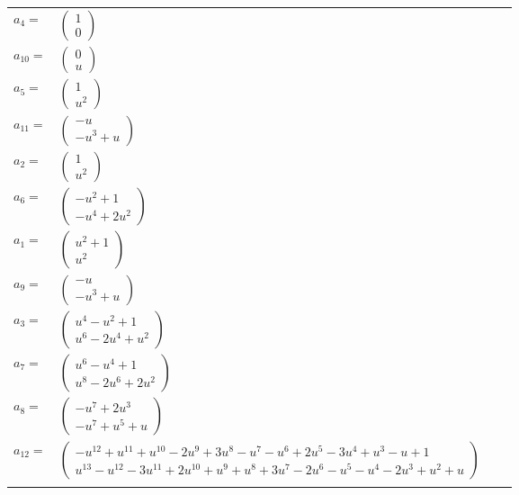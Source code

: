 \documentclass[1p]{elsarticle_modified}
\theoremstyle{definition}
\begin{document}
\begin{tabular}{m{7pt} m{180pt} m{7pt} m{180pt} }
\flushright $a_{4}=$&$\begin{pmatrix}1\\0\end{pmatrix}$ \\
\flushright $a_{10}=$&$\begin{pmatrix}0\\u\end{pmatrix}$ \\
\flushright $a_{5}=$&$\begin{pmatrix}1\\u^2\end{pmatrix}$ \\
\flushright $a_{11}=$&$\begin{pmatrix}- u\\- u^3+u\end{pmatrix}$ \\
\flushright $a_{2}=$&$\begin{pmatrix}1\\u^2\end{pmatrix}$ \\
\flushright $a_{6}=$&$\begin{pmatrix}- u^2+1\\- u^4+2 u^2\end{pmatrix}$ \\
\flushright $a_{1}=$&$\begin{pmatrix}u^2+1\\u^2\end{pmatrix}$ \\
\flushright $a_{9}=$&$\begin{pmatrix}- u\\- u^3+u\end{pmatrix}$ \\
\flushright $a_{3}=$&$\begin{pmatrix}u^4- u^2+1\\u^6-2 u^4+u^2\end{pmatrix}$ \\
\flushright $a_{7}=$&$\begin{pmatrix}u^6- u^4+1\\u^8-2 u^6+2 u^2\end{pmatrix}$ \\
\flushright $a_{8}=$&$\begin{pmatrix}- u^7+2 u^3\\- u^7+u^5+u\end{pmatrix}$ \\
\flushright $a_{12}=$&$\begin{pmatrix}- u^{12}+u^{11}+u^{10}-2 u^9+3 u^8- u^7- u^6+2 u^5-3 u^4+u^3- u+1\\u^{13}- u^{12}-3 u^{11}+2 u^{10}+u^9+u^8+3 u^7-2 u^6- u^5- u^4-2 u^3+u^2+u\end{pmatrix}$\\&\end{tabular}
\end{document}
